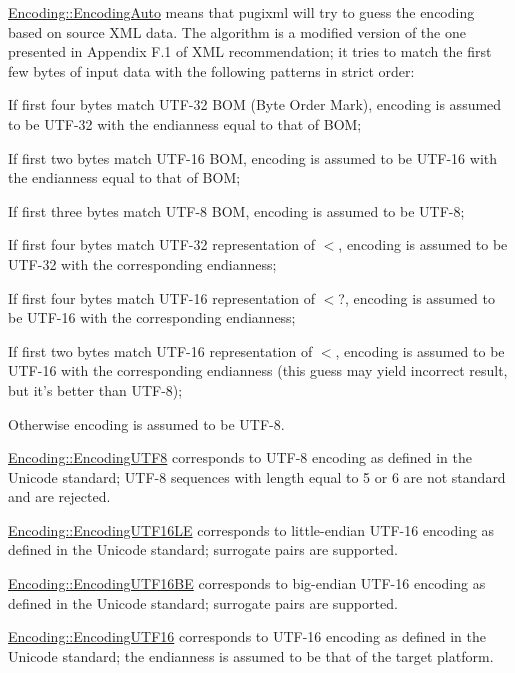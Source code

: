 \begin{DoxyItemize}
\item \hyperlink{namespaceMezzanine_1_1xml_ab1e7e96991b9c08ac13e797a15253804}{Encoding::EncodingAuto} means that pugixml will try to guess the encoding based on source XML data. The algorithm is a modified version of the one presented in Appendix F.1 of XML recommendation; it tries to match the first few bytes of input data with the following patterns in strict order:
\begin{DoxyItemize}
\item If first four bytes match UTF-\/32 BOM (Byte Order Mark), encoding is assumed to be UTF-\/32 with the endianness equal to that of BOM;
\item If first two bytes match UTF-\/16 BOM, encoding is assumed to be UTF-\/16 with the endianness equal to that of BOM;
\item If first three bytes match UTF-\/8 BOM, encoding is assumed to be UTF-\/8;
\item If first four bytes match UTF-\/32 representation of $<$, encoding is assumed to be UTF-\/32 with the corresponding endianness;
\item If first four bytes match UTF-\/16 representation of $<$?, encoding is assumed to be UTF-\/16 with the corresponding endianness;
\item If first two bytes match UTF-\/16 representation of $<$, encoding is assumed to be UTF-\/16 with the corresponding endianness (this guess may yield incorrect result, but it's better than UTF-\/8);
\item Otherwise encoding is assumed to be UTF-\/8.
\end{DoxyItemize}
\item \hyperlink{namespaceMezzanine_1_1xml_ab1e7e96991b9c08ac13e797a15253804}{Encoding::EncodingUTF8} corresponds to UTF-\/8 encoding as defined in the Unicode standard; UTF-\/8 sequences with length equal to 5 or 6 are not standard and are rejected.
\item \hyperlink{namespaceMezzanine_1_1xml_ab1e7e96991b9c08ac13e797a15253804}{Encoding::EncodingUTF16LE} corresponds to little-\/endian UTF-\/16 encoding as defined in the Unicode standard; surrogate pairs are supported.
\item \hyperlink{namespaceMezzanine_1_1xml_ab1e7e96991b9c08ac13e797a15253804}{Encoding::EncodingUTF16BE} corresponds to big-\/endian UTF-\/16 encoding as defined in the Unicode standard; surrogate pairs are supported.
\item \hyperlink{namespaceMezzanine_1_1xml_ab1e7e96991b9c08ac13e797a15253804}{Encoding::EncodingUTF16} corresponds to UTF-\/16 encoding as defined in the Unicode standard; the endianness is assumed to be that of the target platform.

\end{DoxyItemize}
